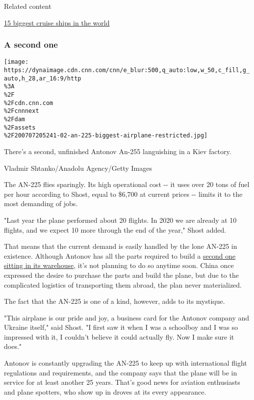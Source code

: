 Related content

\href{/travel/article/worlds-biggest-cruise-ships/index.html}{15 biggest
cruise ships in the world}

\hypertarget{a-second-one}{%
\subsubsection{A second one}\label{a-second-one}}

\texttt{[image: https://dynaimage.cdn.cnn.com/cnn/e\_blur:500,q\_auto:low,w\_50,c\_fill,g\_auto,h\_28,ar\_16:9/http\\\%3A\\\%2F\\\%2Fcdn.cnn.com\\\%2Fcnnnext\\\%2Fdam\\\%2Fassets\\\%2F200707205241-02-an-225-biggest-airplane-restricted.jpg]}

There's a second, unfinished Antonov An-255 languishing in a Kiev
factory.

Vladmir Shtanko/Anadolu Agency/Getty Images

The AN-225 flies sparingly. Its high operational cost -\/- it uses over
20 tons of fuel per hour according to Shost, equal to \$6,700 at current
prices -\/- limits it to the most demanding of jobs.

"Last year the plane performed about 20 flights. In 2020 we are already
at 10 flights, and we expect 10 more through the end of the year," Shost
added.

That means that the current demand is easily handled by the lone AN-225
in existence. Although Antonov has all the parts required to build a
\href{https://edition.cnn.com/travel/article/antonov-an-225-kiev-ukraine/index.html}{second
one sitting in its warehouse}, it's not planning to do so anytime soon.
China once expressed the desire to purchase the parts and build the
plane, but due to the complicated logistics of transporting them abroad,
the plan never materialized.

The fact that the AN-225 is one of a kind, however, adds to its
mystique.

"This airplane is our pride and joy, a business card for the Antonov
company and Ukraine itself," said Shost. "I first saw it when I was a
schoolboy and I was so impressed with it, I couldn't believe it could
actually fly. Now I make sure it does."

Antonov is constantly upgrading the AN-225 to keep up with international
flight regulations and requirements, and the company says that the plane
will be in service for at least another 25 years. That's good news for
aviation enthusiasts and plane spotters, who show up in droves at its
every appearance.

